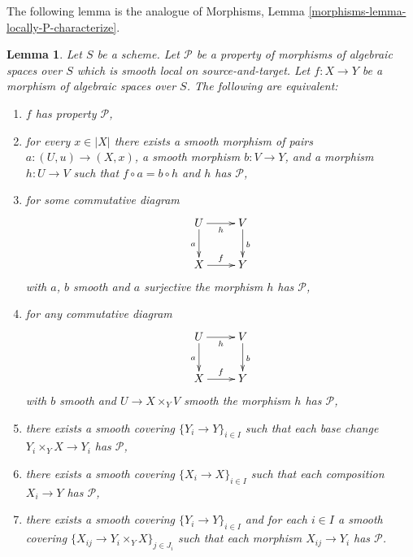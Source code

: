 \documentclass{stacks-project}
\theoremstyle{plain}
\newtheorem{lemma}[subsection]{Lemma}
\theoremstyle{definition}
\theoremstyle{remark}
\numberwithin{equation}{subsection}
\begin{document}
\noindent
The following lemma is the analogue of
Morphisms, Lemma \ref{morphisms-lemma-locally-P-characterize}.

\begin{lemma}
\label{lemma-local-source-target-characterize}
Let $S$ be a scheme.
Let $\mathcal{P}$ be a property of morphisms of algebraic spaces over $S$
which is smooth local on source-and-target. Let $f : X \to Y$ be a morphism
of algebraic spaces over $S$. The following are equivalent:
\begin{enumerate}
\item[(a)] $f$ has property $\mathcal{P}$,
\item[(b)] for every $x \in |X|$ there exists a smooth morphism of pairs
$a : (U, u) \to (X, x)$, a smooth morphism $b : V \to Y$, and
a morphism $h : U \to V$ such that $f \circ a = b \circ h$ and
$h$ has $\mathcal{P}$,
\item[(c)] for some commutative diagram
$$
\xymatrix{
U \ar[d]_a \ar[r]_h & V \ar[d]^b \\
X \ar[r]^f & Y
}
$$
with $a$, $b$ smooth and $a$ surjective the morphism $h$ has $\mathcal{P}$,
\item[(d)] for any commutative diagram
$$
\xymatrix{
U \ar[d]_a \ar[r]_h & V \ar[d]^b \\
X \ar[r]^f & Y
}
$$
with $b$ smooth and $U \to X \times_Y V$ smooth
the morphism $h$ has $\mathcal{P}$,
\item[(e)] there exists a smooth covering $\{Y_i \to Y\}_{i \in I}$ such
that each base change $Y_i \times_Y X \to Y_i$ has $\mathcal{P}$,
\item[(f)] there exists a smooth covering $\{X_i \to X\}_{i \in I}$ such
that each composition $X_i \to Y$ has $\mathcal{P}$,
\item[(g)] there exists a smooth covering $\{Y_i \to Y\}_{i \in I}$ and
for each $i \in I$ a smooth covering
$\{X_{ij} \to Y_i \times_Y X\}_{j \in J_i}$ such that each morphism
$X_{ij} \to Y_i$ has $\mathcal{P}$.
\end{enumerate}
\end{lemma}
\end{document}
